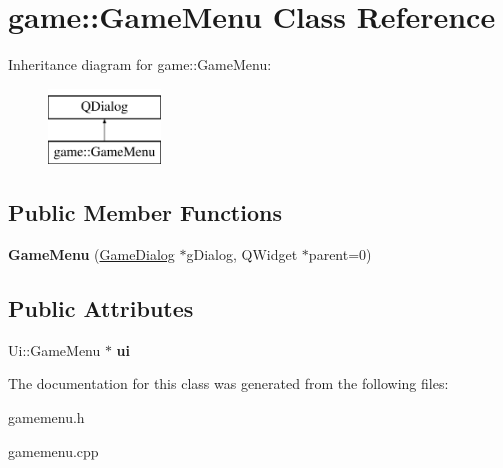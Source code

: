 \hypertarget{classgame_1_1GameMenu}{}\section{game\+:\+:Game\+Menu Class Reference}
\label{classgame_1_1GameMenu}
Inheritance diagram for game\+:\+:Game\+Menu\+:\begin{figure}[H]
\begin{center}
\leavevmode
\includegraphics[height=2.000000cm]{classgame_1_1GameMenu}
\end{center}
\end{figure}
\subsection*{Public Member Functions}
\begin{DoxyCompactItemize}
\item 
\mbox{\label{classgame_1_1GameMenu_aeca8d3ef148f8a7aef0748d6c7294ead}} 
{\bfseries Game\+Menu} (\hyperlink{classgame_1_1GameDialog}{Game\+Dialog} $\ast$g\+Dialog, Q\+Widget $\ast$parent=0)
\end{DoxyCompactItemize}
\subsection*{Public Attributes}
\begin{DoxyCompactItemize}
\item 
\mbox{\label{classgame_1_1GameMenu_a58ed39bf95b0b3b081aafa8ca0f80664}} 
Ui\+::\+Game\+Menu $\ast$ {\bfseries ui}
\end{DoxyCompactItemize}


The documentation for this class was generated from the following files\+:\begin{DoxyCompactItemize}
\item 
gamemenu.\+h\item 
gamemenu.\+cpp\end{DoxyCompactItemize}
